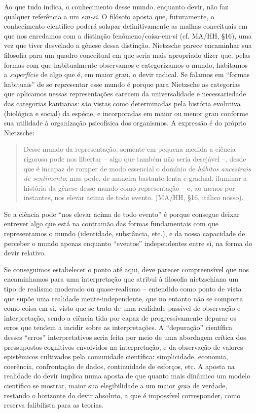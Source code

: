 \documentclass[
	12pt,				%
	openright,			%
	oneside,			%
	a4paper,			%
	english,			%
	french,				%
	spanish,			%
	brazil				%
	]{abntex2}
\begin{document}
Ao que tudo indica, o conhecimento desse mundo, enquanto devir, não faz qualquer referência a um \textit{em-si}. O filósofo aposta que, futuramente, o conhecimento científico poderá solapar definitivamente as malhas conceituais em que nos enredamos com a distinção fenômeno/coisa-em-si (cf. MA/HH, §16), uma vez que tiver desvelado a gênese dessa distinção. Nietzsche parece encaminhar sua filosofia para um quadro conceitual em que seria mais apropriado dizer que, pelas formas com que habitualmente observamos e categorizamos o mundo, habitamos a \textit{superfície} de algo que é, em maior grau, o devir radical. Se falamos em “formas habituais” de se representar esse mundo é porque para Nietzsche as categorias que aplicamos nessas representações carecem da universalidade e necessariedade das categorias kantianas: são vistas como determinadas pela história evolutiva (biológica e social) da espécie, e incorporadas em maior ou menor grau conforme sua utilidade à organização psicofísica dos organismos. A expressão é do próprio Nietzsche: 

\begin{quotation}
Desse mundo da representação, somente em pequena medida a ciência rigorosa pode nos libertar – algo que também não seria desejável –, desde que é incapaz de romper de modo essencial o domínio de \textit{hábitos ancestrais de sentimento}; mas pode, de maneira bastante lenta e gradual, iluminar a história da gênese desse mundo como representação – e, ao menos por instantes, nos elevar acima de todo evento. (MA/HH, §16, itálico nosso). 
\end{quotation}

Se a ciência pode “nos elevar acima de todo evento” é porque consegue deixar entrever algo que está na contramão das formas fundamentais com que representamos o mundo (identidade, substância, etc.), e da nossa capacidade de perceber o mundo apenas enquanto “eventos”  independentes entre si, na forma do devir relativo.		

	Se conseguimos estabelecer o ponto até aqui, deve parecer compreensível que nos encaminhamos para uma interpretação que atribui à filosofia nietzschiana um tipo de realismo moderado ou quase-realismo – entendido como ponto de vista que supõe uma realidade mente-independente, que no entanto não se comporta como coisa-em-si, visto que se trata de uma realidade passível de observação e interpretação, sendo a ciência tida por capaz de progressivamente depurar os erros que tendem a incidir sobre as interpretações. A “depuração” científica desses “erros” interpretativos seria feita por meio de uma abordagem crítica dos pressupostos cognitivos envolvidos na interpretação, e da observação de valores epistêmicos cultivados pela comunidade científica: simplicidade, economia, coerência, confrontação de dados, continuidade de esforços, etc. A aposta na realidade do devir implica numa aposta de que quanto mais dinâmico um modelo científico se mostrar, maior sua elegibilidade a um maior \textit{grau} de verdade, restando o horizonte do devir absoluto, a que é impossível corresponder, como reserva falibilista para as teorias. 
	
\end{document}
